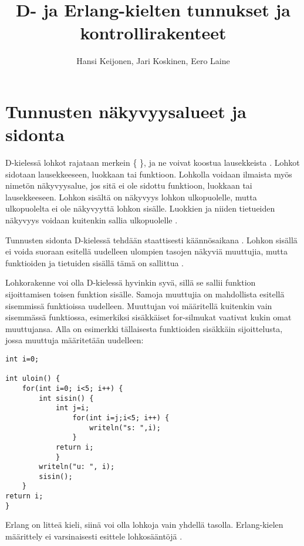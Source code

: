\documentclass[11pt,oneside,a4paper]{article}
\title{D- ja Erlang-kielten tunnukset ja kontrollirakenteet}
\author{Hansi Keijonen, Jari Koskinen, Eero Laine}
\begin{document}
\maketitle

\newpage

\section{Tunnusten näkyvyysalueet ja sidonta}


D-kielessä lohkot rajataan merkein \{ \}, ja ne voivat koostua lausekkeista
\cite{DLA13}. Lohkot sidotaan lausekkeeseen, luokkaan tai funktioon. Lohkolla
voidaan ilmaista myös nimetön näkyvyysalue, jos sitä ei ole sidottu funktioon,
luokkaan tai lausekkeeseen. Lohkon sisältä on näkyvyys lohkon ulkopuolelle,
mutta ulkopuolelta ei ole näkyvyyttä lohkon sisälle. Luokkien ja niiden
tietueiden näkyvyys voidaan kuitenkin sallia ulkopuolelle \cite{DLA13}.

Tunnusten sidonta D-kielessä tehdään staattisesti käännösaikana \cite{DLA13}.
Lohkon sisällä ei voida suoraan esitellä uudelleen ulompien tasojen näkyviä
muuttujia, mutta funktioiden ja tietuiden sisällä tämä on sallittua
\cite{DLA13}.

Lohkorakenne voi olla D-kielessä hyvinkin syvä, sillä se sallii funktion
sijoittamisen toisen funktion sisälle. Samoja muuttujia on mahdollista esitellä
sisemmissä funktioissa uudelleen. Muuttujan voi määritellä kuitenkin vain
sisemmässä funktiossa, esimerkiksi sisäkkäiset for-silmukat vaativat kukin omat
muuttujansa. Alla on esimerkki tällaisesta funktioiden sisäkkäin sijoittelusta,
jossa muuttuja määritetään uudelleen:

\begin{verbatim}
int i=0;

int uloin() {
    for(int i=0; i<5; i++) {
        int sisin() {
            int j=i;
                for(int i=j;i<5; i++) {
                    writeln("s: ",i);
                }
            return i;
            }
        writeln("u: ", i);
        sisin();
    }
return i;
}
\end{verbatim}
Erlang on litteä kieli, siinä voi olla lohkoja vain yhdellä tasolla.
Erlang-kielen määrittely ei varsinaisesti esittele lohkosääntöjä \cite{ERL99}.
\end{document}
